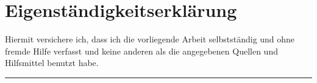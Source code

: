 
\section*{Eigenständigkeitserklärung}

Hiermit versichere ich, dass ich die vorliegende Arbeit selbstständig und ohne fremde Hilfe verfasst und keine anderen als die angegebenen Quellen und Hilfsmittel benutzt habe.
\vspace{3cm}

\noindent{} \hspace{4cm} 
\hrule